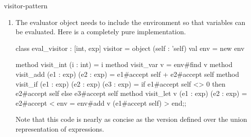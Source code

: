 \begin{exercise}{visitor-pattern}
\begin{answer}
\begin{enumerate}
\begin{ocaml}
class type exp =
  object ('self)
    method accept : 'a 'b. (('a, exp) #visitor as 'b) -> 'a
  end

class int_exp (i : int) =
  object (self : 'self)
    method accept : 'a 'b. (('a, exp) #visitor as 'b) -> 'a =
      fun visitor -> visitor#visit_int i
  end

class var_exp v =
  object (self : 'self)
    method accept : 'a 'b. (('a, exp) #visitor as 'b) -> 'a =
      fun visitor -> visitor#visit_var v
  end

class add_exp (e1 : #exp) (e2 : #exp) =
  object (self : 'self)
    method accept : 'a 'b. (('a, exp) #visitor as 'b) -> 'a =
      fun visitor -> visitor#visit_add e1 e2
  end

class if_exp (e1 : #exp) (e2 : #exp) (e3 : #exp) =
  object (self : 'self)
    method accept : 'a 'b. (('a, exp) #visitor as 'b) -> 'a =
      fun visitor -> visitor#visit_if e1 e2 e3
  end

class let_exp (v : string) (e1 : #exp) (e2 : #exp) =
  object (self : 'self)
    method accept : 'a 'b. (('a, exp) #visitor as 'b) -> 'a =
      fun visitor -> visitor#visit_let v e1 e2
  end;;
\end{ocaml}

\item

The evaluator object needs to include the environment so that
variables can be evaluated.  Here is a completely pure implementation.

\begin{ocaml}
class eval_visitor : [int, exp] visitor =
  object (self : 'self)
    val env = new env

    method visit_int (i : int) =
       i
    method visit_var v =
       env#find v
    method visit_add (e1 : exp) (e2 : exp) =
       e1#accept self + e2#accept self
    method visit_if (e1 : exp) (e2 : exp) (e3 : exp) =
       if e1#accept self <> 0
       then e2#accept self
       else e3#accept self
    method visit_let v (e1 : exp) (e2 : exp) =
       e2#accept {< env = env#add v (e1#accept self) >}
  end;;
\end{ocaml}
%
Note that this code is nearly as concise as the version defined over
the union representation of expressions.
\end{enumerate}
\fi\end{answer}
\end{exercise}



